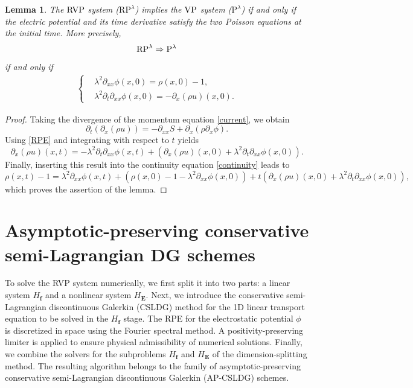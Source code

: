 \documentclass[letterpaper,10pt]{article}
\newtheorem{lemma}{Lemma}[section]
\numberwithin{equation}{section}
\numberwithin{figure}{section}
\numberwithin{table}{section}
\begin{document}
\begin{lemma}
The ${\rm RVP}$ system {\rm ($\text{RP}^{\lambda}$)} implies the ${\rm VP}$ system {\rm ($\text{P}^{\lambda}$)} if and only if the electric potential and its time derivative satisfy the two Poisson equations at the initial time.
More precisely,
\begin{align*}
  {\rm RP}^{\lambda} \Rightarrow {\rm P}^{\lambda}
\end{align*}
if and only if
\begin{align}
  \left\{
  \begin{aligned}
    &\lambda^2 \partial_{xx}\phi(x,0) = \rho(x,0)-1,\\
    &\lambda^2 \partial_t\partial_{xx}\phi(x,0)=-\partial_x(\rho u)(x,0).
  \end{aligned}
  \right.
\end{align}
\end{lemma}
\begin{proof}
  Taking the divergence of the momentum equation \eqref{current}, we obtain
  $$
    \partial_t\left(\partial_x (\rho u)\right)=-\partial_{xx}S+\partial_x \left(\rho \partial_x \phi\right) .
  $$
  Using \eqref{RPE} and integrating with respect to $t$ yields
  $$
    \partial_x (\rho u)(x, t)=-\lambda^2 \partial_t \partial_{xx} \phi(x, t)+\left(\partial_x (\rho u)(x, 0)+\lambda^2 \partial_t \partial_{xx} \phi(x, 0)\right) .
  $$
  Finally, inserting this result into the continuity equation \eqref{continuity} leads to
  $$
    \rho(x, t)-1=\lambda^2 \partial_{xx} \phi(x, t)+\left(\rho(x, 0)-1-\lambda^2 \partial_{xx} \phi(x, 0)\right)+t\left(\partial_x (\rho u)(x, 0)+\lambda^2 \partial_t \partial_{xx} \phi(x, 0)\right),
  $$
  which proves the assertion of the lemma.
\end{proof} 


\section{Asymptotic-preserving conservative semi-Lagrangian DG schemes}

\hspace{4pt}
To solve the RVP system numerically, we first split it into two parts: a linear system $H_{\mathbf{f}}$ and a nonlinear system $H_{\mathbf{E}}$. Next, we introduce the conservative semi-Lagrangian discontinuous Galerkin (CSLDG) method for the 1D linear transport equation to be solved in the $H_{\mathbf{f}}$ stage. The RPE for the electrostatic potential $\phi$ is discretized in space using the Fourier spectral method. A positivity-preserving limiter is applied to ensure physical admissibility of numerical solutions. Finally, we combine the solvers for the subproblems $H_{\mathbf{f}}$  and $H_{\mathbf{E}}$ of the dimension-splitting method. The resulting algorithm belongs to the family of asymptotic-preserving conservative semi-Lagrangian discontinuous Galerkin (AP-CSLDG) schemes.
\end{document}
